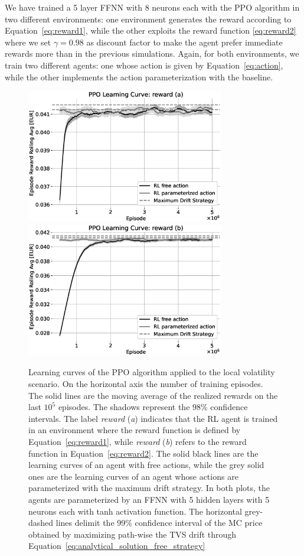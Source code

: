 \documentclass[runningheads]{m2ef}
\newcommand{\change}[1]{{\color{red} {#1}}}%
\begin{document}
We have trained a 5 layer FFNN with 8 neurons each with the PPO algorithm in two different environments: one environment generates the reward according to Equation~\eqref{eq:reward1}, while the other exploits the reward function \eqref{eq:reward2} where we set $\gamma=0.98$ as discount factor to make the agent prefer immediate rewards \change{more than in the previous simulations}. Again, for both environments, we train two different agents: one whose action is given by Equation~\eqref{eq:action}, while the other implements the action parameterization with the baseline.
\begin{figure}[h!]
	\centering
	\includegraphics[width=3.4in]{LV_PPO_reward_a_learning_curve.eps}
	\includegraphics[width=3.4in]{LV_PPO_reward_b_learning_curve.eps}
	\caption{Learning curves of the PPO algorithm applied to the local volatility \change{scenario}. On the horizontal axis the number of training episodes. The solid lines are the moving average of the realized rewards on the last $10^5$ episodes. The shadows represent the $98\%$ confidence intervals. The label {\it reward} ({\it a}) indicates that the RL agent is trained in an environment where the reward function is defined by Equation~\eqref{eq:reward1}, while {\it reward} ({\it b}) refers to the reward function in Equation~\eqref{eq:reward2}. The solid black lines are the learning curves of an agent with free actions, while the grey solid ones are the learning curves of an agent whose actions are parameterized with the maximum drift strategy. In both plots, the agents are parameterized by an FFNN with 5 hidden layers with 5 neurons each with tanh activation function. The horizontal grey-dashed lines delimit the 99\% confidence interval of the MC price obtained by maximizing path-wise the TVS drift through Equation~\eqref{eq:analytical_solution_free_strategy}}\label{fig:PPO_results}
\end{figure}
\end{document}
